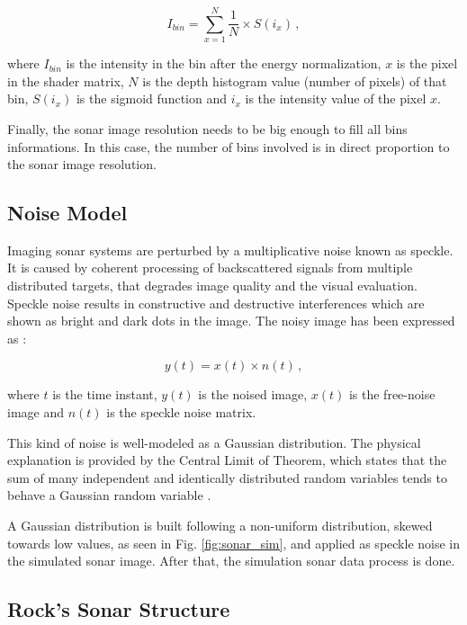 \documentclass[final,5p,times]{elsarticle}
\begin{document}
\begin{equation}
    \label{eq:1}
    I_{bin} = \sum\limits_{x=1}^N \frac{1}{N} \times S(i_{x}) \, ,
\end{equation}

where $I_{bin}$ is the intensity in the bin after the energy normalization, $x$ is the pixel in the shader matrix, $N$ is the depth histogram value (number of pixels) of that bin, $S(i_{x})$ is the sigmoid function and $i_{x}$ is the intensity value of the pixel $x$.

Finally, the sonar image resolution needs to be big enough to fill all bins informations. In this case, the number of bins involved is in direct proportion to the sonar image resolution.


\subsection{Noise Model}
\label{dev:noise}

Imaging sonar systems are perturbed by a multiplicative noise known as speckle. It is caused by coherent processing of backscattered signals from multiple distributed targets, that degrades image quality and the visual evaluation. Speckle noise results in constructive and destructive interferences which are shown as bright and dark dots in the image. The noisy image has been expressed as \cite{lee1980}:

\begin{equation}
\label{eq:2}
y(t) = x(t) \times n(t) \, ,
\end{equation}

where $t$ is the time instant, $y(t)$ is the noised image, $x(t)$ is the free-noise image and $n(t)$ is the speckle noise matrix.

This kind of noise is well-modeled as a Gaussian distribution. The physical explanation is provided by the Central Limit of Theorem, which states that the sum of many independent and identically distributed random variables tends to behave a Gaussian random variable \cite{papoulis2002}.

A Gaussian distribution is built following a non-uniform distribution, skewed towards low values, as seen in Fig. \ref{fig:sonar_sim}, and applied as speckle noise in the simulated sonar image. After that, the simulation sonar data process is done.

\subsection{Rock's Sonar Structure}
\label{dev:rock}
\end{document}
